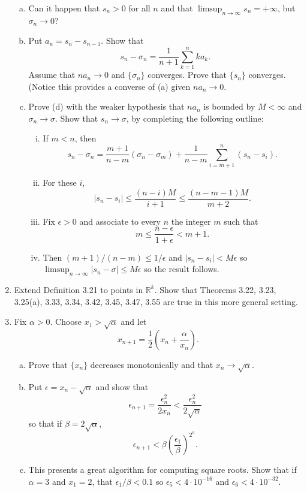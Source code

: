 \documentclass{scrbook}
\newcommand{\R}{\mathbb{R}}
\renewcommand{\to}{\rightarrow}
\begin{document}
\begin{enumerate}
\begin{enumerate}[(a)]
\item Can it happen that $s_n > 0$ for all $n$ and that $\limsup_{n \to \infty} s_n = +\infty$, but $\sigma_n \to 0$?

\item Put $a_n = s_n - s_{n-1}$. Show that
\[
	s_n - \sigma_n = \frac{1}{n + 1} \sum_{k=1}^{n} ka_k.
\]
Assume that $na_n \to 0$ and $\{\sigma_n\}$ converges. Prove that $\{s_n\}$ converges. (Notice this provides a converse of (a) given $na_n \to 0$.

\item Prove (d) with the weaker hypothesis that $na_n$ is bounded by $M < \infty$ and $\sigma_n \to \sigma$. Show that $s_n \to \sigma$, by completing the following outline:
\begin{enumerate}[(i)]
\item If $m < n$, then
\[
	s_n - \sigma_n = \frac{m+1}{n-m}(\sigma_n - \sigma_m) + \frac{1}{n-m}\sum_{i=m+1}^{n} (s_n - s_i).
\]
\item For these $i$, 
\[
	|s_n - s_i| \le \frac{(n-i)M}{i+1} \le \frac{(n-m-1)M}{m+2}.
\]
\item Fix $\epsilon > 0$ and associate to every $n$ the integer $m$ such that
\[
	m \le \frac{n - \epsilon}{1 + \epsilon} < m + 1.
\]
\item Then $(m+1)/(n-m) \le 1/\epsilon$ and $|s_n - s_i| < M\epsilon$ so $\limsup_{n \to \infty} |s_n - \sigma| \le M\epsilon$ so the result follows.
\end{enumerate}
\end{enumerate}

\item %
Extend Definition 3.21 to points in $\R^k$. Show that Theorems 3.22, 3.23, 3.25(a), 3.33, 3.34, 3.42, 3.45, 3.47, 3.55 are true in this more general setting.

\item %
Fix $\alpha > 0$. Choose $x_1 > \sqrt{\alpha}$ and let
\[
	x_{n+1} = \frac{1}{2} \left(x_n + \frac{\alpha}{x_n}\right).
\]
\begin{enumerate}[(a)]
\item Prove that $\{x_n\}$ decreases monotonically and that $x_n \to \sqrt{\alpha}$.

\item Put $\epsilon = x_n - \sqrt{\alpha}$ and show that
\[
	\epsilon_{n+1} = \frac{\epsilon_n^2}{2x_n} < \frac{\epsilon_n^2}{2\sqrt{\alpha}}
\]
so that if $\beta = 2\sqrt{\alpha}$,
\[
	\epsilon_{n+1} < \beta\left(\frac{\epsilon_1}{\beta}\right)^{2^n}.
\]
\item This presents a great algorithm for computing square roots. Show that if $\alpha = 3$ and $x_1 = 2$, that $\epsilon_1/\beta < 0.1$ so $\epsilon_5 < 4 \cdot 10^{-16}$ and $\epsilon_6 < 4 \cdot 10^{-32}$.
\end{enumerate}


\end{enumerate}
\end{document}
